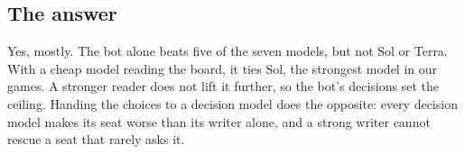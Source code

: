 \subsection{The answer}

Yes, mostly. The bot alone beats five of the seven models, but not Sol or Terra. With a cheap model reading the board, it ties Sol, the strongest model in our games. A stronger reader does not lift it further, so the bot's decisions set the ceiling. Handing the choices to a decision model does the opposite: every decision model makes its seat worse than its writer alone, and a strong writer cannot rescue a seat that rarely asks it.
